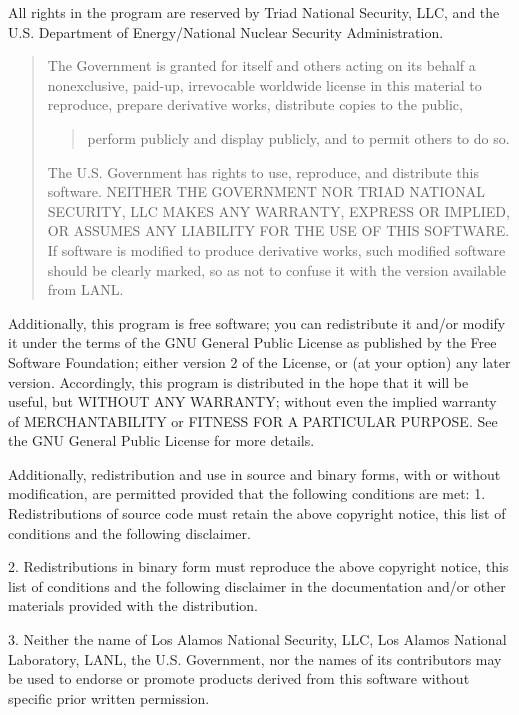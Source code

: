 \documentclass[letterpaper,10pt,english]{sphinxmanual}
\begin{document}
All rights in the program are reserved by Triad National Security, LLC,
and the U.S. Department of Energy/National Nuclear Security Administration.
\begin{quote}

The Government is granted for itself and others acting on its behalf a
nonexclusive, paid-up, irrevocable worldwide license in this material
to reproduce, prepare derivative works, distribute copies to the public,
\begin{quote}

perform publicly and display publicly, and to permit others to do so.
\end{quote}

The U.S. Government has rights to use, reproduce, and distribute this software.
NEITHER THE GOVERNMENT NOR TRIAD NATIONAL SECURITY, LLC MAKES ANY WARRANTY,
EXPRESS OR IMPLIED, OR ASSUMES ANY LIABILITY FOR THE USE OF THIS SOFTWARE.
If software is modified to  produce derivative works, such modified
software should be clearly marked, so as not to confuse it with the
version available from LANL.
\end{quote}

Additionally, this program is free software; you can redistribute it and/or
modify it under the terms of the GNU General Public License as published by the
Free Software Foundation; either version 2 of the License, or (at your option)
any later version. Accordingly, this program is distributed in the hope that it
will be useful, but WITHOUT ANY WARRANTY; without even the implied warranty of
MERCHANTABILITY or FITNESS FOR A PARTICULAR PURPOSE. See the GNU General Public
License for more details.

Additionally, redistribution and use in source and binary forms, with or
without modification, are permitted provided that the following conditions are
met:
1.       Redistributions of source code must retain the above copyright notice,
this list of conditions and the following disclaimer.

2.      Redistributions in binary form must reproduce the above copyright
notice, this list of conditions and the following disclaimer in the
documentation and/or other materials provided with the distribution.

3.      Neither the name of Los Alamos National Security, LLC, Los Alamos
National Laboratory, LANL, the U.S. Government, nor the names of its
contributors may be used to endorse or promote products derived from this
software without specific prior written permission.
\end{document}

